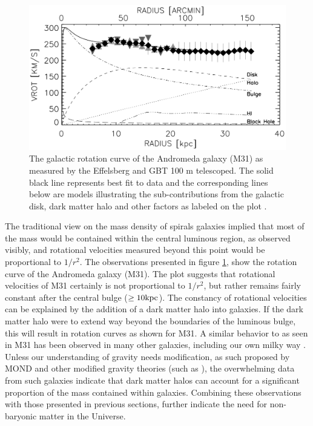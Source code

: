 \begin{figure}[ht!]
    \begin{center}
        \includegraphics[scale=0.35]{Chapter_1/Figures/Rotation_curve_M31.jpg}
        \caption[Observed rotation curve and corresponding mass models for the Andromeda galaxy (M31) by using data from the Effelsberg and GBT 100 m observations.]%
        {The galactic rotation curve of the Andromeda galaxy (M31) as measured by the Effelsberg and GBT 100 m telescoped. The solid black line represents best fit to data and the corresponding lines below are models illustrating the sub-contributions from the galactic disk, dark matter halo and other factors as labeled on the plot \cite{Carignan_2006}.}
        \label{fig:rotation_m31}
        \end{center}
\end{figure}

The traditional view on the mass density of spirals galaxies implied that most of the mass would be contained within the central luminous region, as observed visibly, and rotational velocities measured beyond this point would be proportional to $1/r^2$. The observations presented in figure \ref{fig:rotation_m31}, show the rotation curve of the Andromeda galaxy (M31). The plot suggests that rotational velocities of M31 certainly is not proportional to $1/r^2$, but rather remains fairly constant after the central bulge ($\geq 10 \text{kpc}$). The constancy of rotational velocities can be explained by the addition of a dark matter halo into galaxies. If the dark matter halo were to extend way beyond the boundaries of the luminous bulge, this will result in rotation curves as shown for M31. A similar behavior to as seen in M31 has been observed in many other galaxies, including our own milky way \cite{Carignan_2006, Mr_z_2019}. Unless our understanding of gravity needs modification, as such proposed by MOND and other modified gravity theories (such as \cite{Milgrom_2015, Moffat_2006}), the overwhelming data from such galaxies indicate that dark matter halos can account for a significant proportion of the mass contained within galaxies. Combining these observations with those presented in previous sections, further indicate the need for non-baryonic matter in the Universe.



